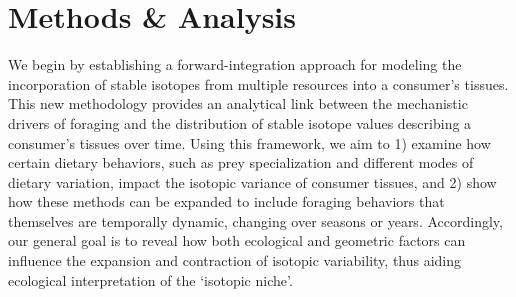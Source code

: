 \documentclass{frontiersSCNS}
\begin{document}
\section{Methods \& Analysis}
We begin by establishing a forward-integration approach for modeling the incorporation of stable isotopes from multiple resources into a consumer's tissues.
This new methodology provides an analytical link between the mechanistic drivers of foraging and the distribution of stable isotope values describing a consumer's tissues over time.
Using this framework, we aim to
1) examine how certain dietary behaviors, such as prey specialization and different modes of dietary variation, impact the isotopic variance of consumer tissues, and
2) show how these methods can be expanded to include foraging behaviors that themselves are temporally dynamic, changing over seasons or years.
Accordingly, our general goal is to reveal how both ecological and geometric factors can influence the expansion and contraction of isotopic variability, thus aiding ecological interpretation of the `isotopic niche'.
\end{document}
